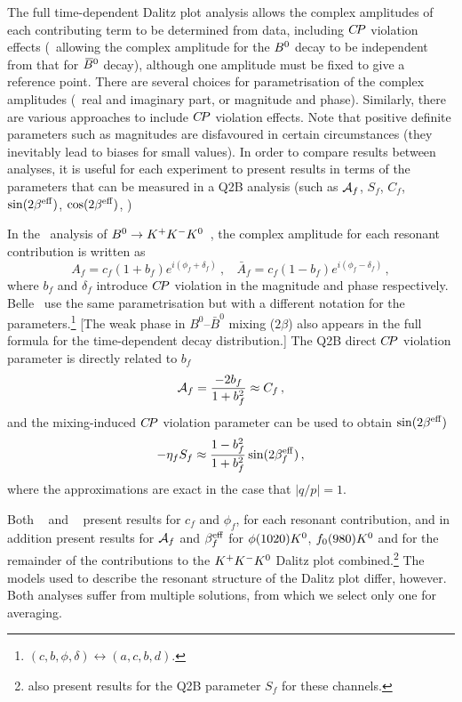 The full time-dependent Dalitz plot analysis allows 
the complex amplitudes of each contributing term to be determined from data,
including $C\!P$ violation effects
(\ie\ allowing the complex amplitude for the $B^0$ decay to be independent
from that for $\kern 0.18em\overline{\kern -0.18em B}{}^0$ decay), although one amplitude must be fixed 
to give a reference point.
There are several choices for parametrisation of the complex amplitudes 
(\eg\ real and imaginary part, or magnitude and phase).
Similarly, there are various approaches to include $C\!P$ violation effects.
Note that positive definite parameters such as magnitudes are
disfavoured in certain circumstances 
(they inevitably lead to biases for small values).
In order to compare results between analyses,
it is useful for each experiment to present results in terms of the 
parameters that can be measured in a Q2B analysis
(such as ${\cal A}_{f}$, $S_f$, $C_f$, 
$\sin(2\beta^{\rm eff})$, $\cos(2\beta^{\rm eff})$, \etc)

In the \babar\ analysis of $B^0 \to K^+K^-K^0$~\cite{Lees:2012kx},
the complex amplitude for each resonant contribution is written as
\begin{equation}
  A_f = c_f ( 1 + b_f ) e^{i ( \phi_f + \delta_f )} 
  \ , \ \ \ \ 
  \bar{A}_f = c_f ( 1 - b_f ) e^{i ( \phi_f - \delta_f )} \, ,
\end{equation}
where $b_f$ and $\delta_f$ introduce $C\!P$ violation in the magnitude 
and phase respectively.
Belle~\cite{Nakahama:2010nj} use the same parametrisation but with a different notation for the parameters.\footnote{
  $(c, b, \phi, \delta) \leftrightarrow (a, c, b, d)$.
}
[The weak phase in $B^0$--$\bar{B}^0$ mixing ($2\beta$) also appears 
in the full formula for the time-dependent decay distribution.]
The Q2B direct $C\!P$ violation parameter is directly related to $b_f$
\begin{equation}
  {\cal A}_{f} = \frac{-2b_f}{1+b_f^2} \approx C_f \, ,
\end{equation}
and the mixing-induced $C\!P$ violation parameter can be used to obtain
$\sin(2\beta^{\rm eff})$
\begin{equation}
  -\eta_f S_f \approx \frac{1-b_f^2}{1+b_f^2}\sin(2\beta^{\rm eff}_f) \, ,
\end{equation}
where the approximations are exact in the case that $\left| q/p \right| = 1$.

Both \babar~\cite{Lees:2012kx} and \belle~\cite{Nakahama:2010nj} present results for $c_f$ and $\phi_f$,
for each resonant contribution,
and in addition present results for ${\cal A}_{f}$ and $\beta^{\rm eff}_{f}$ for $\phi(1020) K^0$, $f_0(980) K^0$ and for the remainder of the contributions to the $K^+K^-K^0$ Dalitz plot combined.\footnote{
  \babar also present results for the Q2B parameter $S_{f}$ for these channels.
}
The models used to describe the resonant structure of the Dalitz plot differ, however.  Both analyses suffer from multiple solutions, from which we select only one for averaging.

